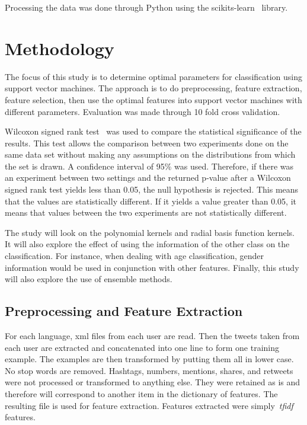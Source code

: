 \documentclass[a4paper]{llncs}
\begin{document}
Processing the data was done through Python using the scikits-learn~\cite{scikit-learn} library. 

\section{Methodology}
The focus of this study is to determine optimal parameters for classification using support vector machines. The approach is to do preprocessing, feature extraction, feature selection, then use the optimal features into support vector machines with different parameters. Evaluation was made through 10 fold cross validation.

Wilcoxon signed rank test~\cite{wilcoxon1945individual} was used to compare the statistical significance of the results. This test allows the comparison between two experiments done on the same data set without making any assumptions on the distributions from which the set is drawn. A confidence interval of 95\% was used. Therefore, if there was an experiment between two settings and the returned p-value after a Wilcoxon signed rank test yields less than 0.05, the null hypothesis is rejected. This means that the values are statistically different. If it yields a value greater than 0.05, it means that values between the two experiments are not statistically different. 

The study will look on the polynomial kernels and radial basis function kernels. It will also explore the effect of using the information of the other class on the classification. For instance, when dealing with age classification, gender information would be used in conjunction with other features. Finally, this study will also explore the use of ensemble methods. 

\subsection{Preprocessing and Feature Extraction}
For each language, xml files from each user are read. Then the tweets taken from each user are extracted and concatenated into one line to form one training example. The examples are then transformed by putting them all in lower case. No stop words are removed. Hashtags, numbers, mentions, shares, and retweets were not processed or transformed to anything else. They were retained as is and therefore will correspond to another item in the dictionary of features. The resulting file is used for feature extraction.  Features extracted were simply~\textit{tfidf} features.  
\end{document}

